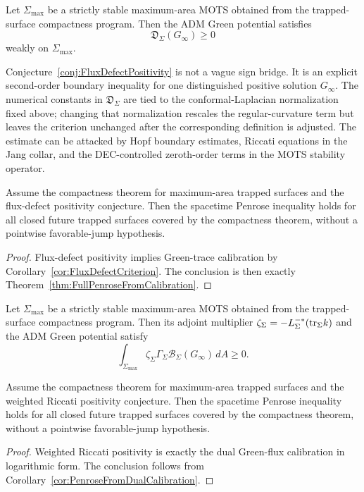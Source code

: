 \begin{conjecture}\label{conj:FluxDefectPositivity}
Let \(\Sigma_{\max}\) be a strictly stable maximum-area MOTS obtained from the trapped-surface compactness program. Then the ADM Green potential satisfies
\[
    \mathfrak D_\Sigma(G_\infty)\ge0
\]
weakly on \(\Sigma_{\max}\).
\end{conjecture}

\begin{remark}
Conjecture~\ref{conj:FluxDefectPositivity} is not a vague sign bridge. It is an explicit second-order boundary inequality for one distinguished positive solution \(G_\infty\). The numerical constants in \(\mathfrak D_\Sigma\) are tied to the conformal-Laplacian normalization fixed above; changing that normalization rescales the regular-curvature term but leaves the criterion unchanged after the corresponding definition is adjusted. The estimate can be attacked by Hopf boundary estimates, Riccati equations in the Jang collar, and the DEC-controlled zeroth-order terms in the MOTS stability operator.
\end{remark}

\begin{theorem}\label{thm:PenroseFromFluxDefect}
Assume the compactness theorem for maximum-area trapped surfaces and the flux-defect positivity conjecture. Then the spacetime Penrose inequality holds for all closed future trapped surfaces covered by the compactness theorem, without a pointwise favorable-jump hypothesis.
\end{theorem}

\begin{proof}
Flux-defect positivity implies Green-trace calibration by Corollary~\ref{cor:FluxDefectCriterion}. The conclusion is then exactly Theorem~\ref{thm:FullPenroseFromCalibration}.
\end{proof}

\begin{conjecture}\label{conj:WeightedRiccatiPositivity}
Let \(\Sigma_{\max}\) be a strictly stable maximum-area MOTS obtained from the trapped-surface compactness program. Then its adjoint multiplier \(\zeta_\Sigma=-L_\Sigma^{-*}(\mathrm{tr}_\Sigma k)\) and the ADM Green potential satisfy
\[
    \int_{\Sigma_{\max}}\zeta_\Sigma\Gamma_\Sigma
    \mathcal B_\Sigma(G_\infty)\,dA\ge0 .
\]
\end{conjecture}

\begin{theorem}\label{thm:PenroseFromWeightedRiccati}
Assume the compactness theorem for maximum-area trapped surfaces and the weighted Riccati positivity conjecture. Then the spacetime Penrose inequality holds for all closed future trapped surfaces covered by the compactness theorem, without a pointwise favorable-jump hypothesis.
\end{theorem}

\begin{proof}
Weighted Riccati positivity is exactly the dual Green-flux calibration in logarithmic form. The conclusion follows from Corollary~\ref{cor:PenroseFromDualCalibration}.
\end{proof}
